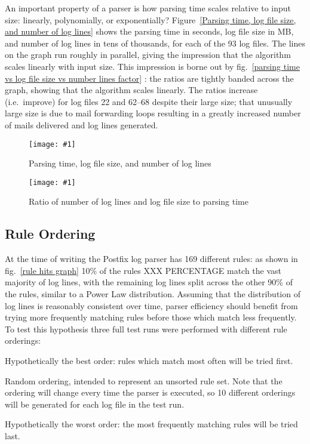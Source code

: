 \documentclass{svmult}
\newcommand{\showgraph}[3]{%
    \begin{figure}[btp]%
        \texttt{[image: \#1]}%
        \caption{#2}\label{#3}%
    \end{figure}%
}
\newcommand{\refwithlabel}[2]{%
    #1~\vref{#2}%
}
\newcommand{\graphref}[1]{%
    \refwithlabel{fig.}{#1}%
}
\newcommand{\Graphref}[1]{%
    \refwithlabel{Figure}{#1}%
}
\newcommand{\numberOFlogFILES}[0]{%
    93%
}
\newcommand{\numberOFrules}[0]{%
    169%
}
\begin{document}
An important property of a parser is how parsing time scales relative to
input size: linearly, polynomially, or exponentially?  \Graphref{Parsing
time, log file size, and number of log lines} shows the parsing time in
seconds, log file size in MB, and number of log lines in tens of thousands,
for each of the \numberOFlogFILES{} log files.  The lines on the graph run
roughly in parallel, giving the impression that the algorithm scales
linearly with input size.  This impression is borne out by
\graphref{parsing time vs log file size vs number lines factor}: the ratios
are tightly banded across the graph, showing that the algorithm scales
linearly.  The ratios increase (i.e.\ improve) for log files 22 and 62--68
despite their large size; that unusually large size is due to mail
forwarding loops resulting in a greatly increased number of mails delivered
and log lines generated.

\showgraph{build/graph-input-size-vs-parsing-time}{Parsing time, log file size,
and number of log lines}{Parsing time, log file size, and number of log lines}
\showgraph{build/graph-input-size-vs-parsing-time-ratio}{Ratio of number of
log lines and log file size to parsing time}{parsing time vs log file size vs
number lines factor}

\subsection{Rule Ordering}

\label{Rule ordering}

At the time of writing the Postfix log parser has \numberOFrules{}
different rules: as shown in \graphref{rule hits graph} 10\% of the rules
XXX PERCENTAGE match the vast majority of log lines, with the remaining log lines split
across the other 90\% of the rules, similar to a Power Law distribution.
Assuming that the distribution of log lines is reasonably consistent over
time, parser efficiency should benefit from trying more frequently matching
rules before those which match less frequently.  To test this hypothesis
three full test runs were performed with different rule orderings:

\begin{description}[shuffled]

    \item [optimal]  Hypothetically the best order: rules which match most
        often will be tried first.

    \item [shuffled] Random ordering, intended to represent an unsorted rule
        set.  Note that the ordering will change every time the parser is
        executed, so 10 different orderings will be generated for each log
        file in the test run.

    \item [reverse] Hypothetically the worst order: the most frequently
        matching rules will be tried last.

\end{description}
\end{document}
